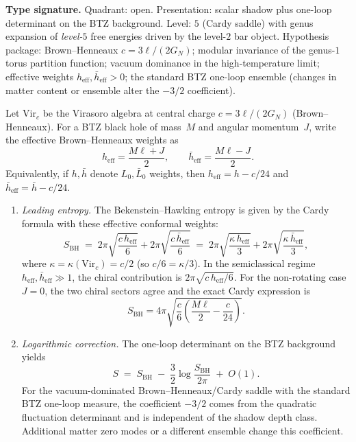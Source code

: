\begin{theorem}
\label{thm:ent-btz-entropy}
\textbf{Type signature.}  Quadrant: open.  Presentation: scalar shadow
plus one-loop determinant on the BTZ background.  Level: $5$ (Cardy
saddle) with genus expansion of \emph{level-$5$} free energies driven
by the level-$2$ bar object.  Hypothesis package:
Brown--Henneaux $c=3\ell/(2G_N)$; modular invariance of the genus-$1$
torus partition function; vacuum dominance in the high-temperature
limit; effective weights $h_{\mathrm{eff}},\bar h_{\mathrm{eff}}>0$;
the standard BTZ one-loop ensemble (changes in matter content or
ensemble alter the $-3/2$ coefficient).

Let $\mathrm{Vir}_c$ be the Virasoro algebra at central
charge $c = 3\ell/(2G_N)$ \textup{(}Brown--Henneaux\textup{)}.
For a BTZ black hole of mass~$M$ and angular momentum~$J$, write the
effective Brown--Henneaux weights as
\[
h_{\mathrm{eff}}=\frac{M\ell+J}{2},
\qquad
\bar h_{\mathrm{eff}}=\frac{M\ell-J}{2}.
\]
Equivalently, if $h,\bar h$ denote $L_0,\bar L_0$ weights, then
$h_{\mathrm{eff}}=h-c/24$ and
$\bar h_{\mathrm{eff}}=\bar h-c/24$.
\begin{enumerate}[label=\textup{(\roman*)}]
\item \emph{Leading entropy.}
The Bekenstein--Hawking entropy is given by the Cardy
formula with these effective conformal weights:
\begin{equation}\label{eq:ent-btz-leading}
S_{\mathrm{BH}}
\;=\;
2\pi\sqrt{\frac{c\,h_{\mathrm{eff}}}{6}}
+ 2\pi\sqrt{\frac{c\,\bar{h}_{\mathrm{eff}}}{6}}
\;=\;
2\pi\sqrt{\frac{\kappa\,h_{\mathrm{eff}}}{3}}
+ 2\pi\sqrt{\frac{\kappa\,\bar{h}_{\mathrm{eff}}}{3}},
\end{equation}
where $\kappa = \kappa(\mathrm{Vir}_c) = c/2$
\textup{(}so $c/6 = \kappa/3$\textup{)}.
In the semiclassical regime $h_{\mathrm{eff}},
\bar h_{\mathrm{eff}}\gg1$, the chiral contribution is
$2\pi\sqrt{c\,h_{\mathrm{eff}}/6}$.
For the non-rotating case $J = 0$, the two chiral sectors agree and
the exact Cardy expression is
\[
S_{\mathrm{BH}}
=4\pi\sqrt{\frac{c}{6}\left(\frac{M\ell}{2}-\frac{c}{24}\right)}.
\]

\item \emph{Logarithmic correction.}
The one-loop determinant on the BTZ background yields
\begin{equation}\label{eq:ent-btz-log}
S
\;=\;
S_{\mathrm{BH}}
\;-\;\frac{3}{2}\log\frac{S_{\mathrm{BH}}}{2\pi}
\;+\; O(1).
\end{equation}
For the vacuum-dominated Brown--Henneaux/Cardy saddle with the
standard BTZ one-loop measure, the coefficient $-3/2$ comes from the
quadratic fluctuation determinant and is independent of the shadow
depth class.  Additional matter zero modes or a different ensemble
change this coefficient.


\end{enumerate}
\end{theorem}
